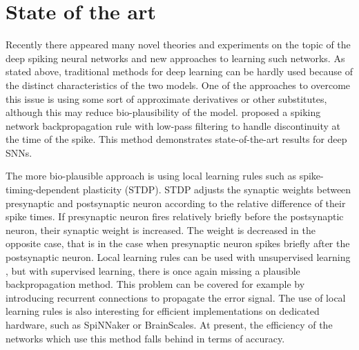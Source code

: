 \section{State of the art}
Recently there appeared many novel theories and experiments on the topic of the deep spiking neural networks and new approaches to learning such networks. As stated above, traditional methods for deep learning can be hardly used because of the distinct characteristics of the two models. One of the approaches to overcome this issue is using some sort of approximate derivatives or other substitutes, although this may reduce bio-plausibility of the model. \cite{leeTrainingDeepSpiking2016} proposed a spiking network backpropagation rule with low-pass filtering to handle discontinuity at the time of the spike. This method demonstrates state-of-the-art results for deep SNNs.\par
The more bio-plausible approach is using local learning rules such as spike-timing-dependent plasticity (STDP). STDP adjusts the synaptic weights between presynaptic and postsynaptic neuron according to the relative difference of their spike times. If presynaptic neuron fires relatively briefly before the postsynaptic neuron, their synaptic weight is increased. The weight is decreased in the opposite case, that is in the case when presynaptic neuron spikes briefly after the postsynaptic neuron. Local learning rules can be used with unsupervised learning \cite{tavanaeiDeepLearningSpiking2019}, but with supervised learning, there is once again missing a plausible backpropagation method. This problem can be covered for example by introducing recurrent connections to propagate the error signal. The use of local learning rules is also interesting for efficient implementations on dedicated hardware, such as SpiNNaker\cite{furberSpiNNakerProject14} or BrainScales. At present, the efficiency of the networks which use this method falls behind in terms of accuracy. \par
